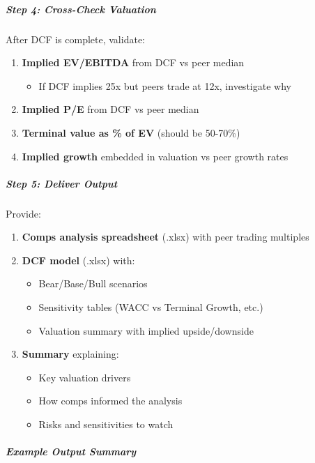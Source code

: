 \documentclass[11pt]{article}
\begin{document}
\subparagraph{Step 4: Cross-Check Valuation}\mbox{}\par

After DCF is complete, validate:

\begin{enumerate}[leftmargin=*,itemsep=2pt,topsep=2pt]
\item {} \textbf{Implied EV/EBITDA} from DCF vs peer median
\begin{itemize}[leftmargin=*,itemsep=2pt,topsep=2pt]
\item {} If DCF implies 25x but peers trade at 12x, investigate why
\end{itemize}
\item {} \textbf{Implied P/E} from DCF vs peer median
\item {} \textbf{Terminal value as \% of EV} (should be 50-70\%)
\item {} \textbf{Implied growth} embedded in valuation vs peer growth rates
\end{enumerate}

\subparagraph{Step 5: Deliver Output}\mbox{}\par

Provide:

\begin{enumerate}[leftmargin=*,itemsep=2pt,topsep=2pt]
\item {} \textbf{Comps analysis spreadsheet} (.xlsx) with peer trading multiples
\item {} \textbf{DCF model} (.xlsx) with:
\begin{itemize}[leftmargin=*,itemsep=2pt,topsep=2pt]
\item {} Bear/Base/Bull scenarios
\item {} Sensitivity tables (WACC vs Terminal Growth, etc.)
\item {} Valuation summary with implied upside/downside
\end{itemize}
\item {} \textbf{Summary} explaining:
\begin{itemize}[leftmargin=*,itemsep=2pt,topsep=2pt]
\item {} Key valuation drivers
\item {} How comps informed the analysis
\item {} Risks and sensitivities to watch
\end{itemize}
\end{enumerate}

\subparagraph{Example Output Summary}\mbox{}\par
\end{document}
